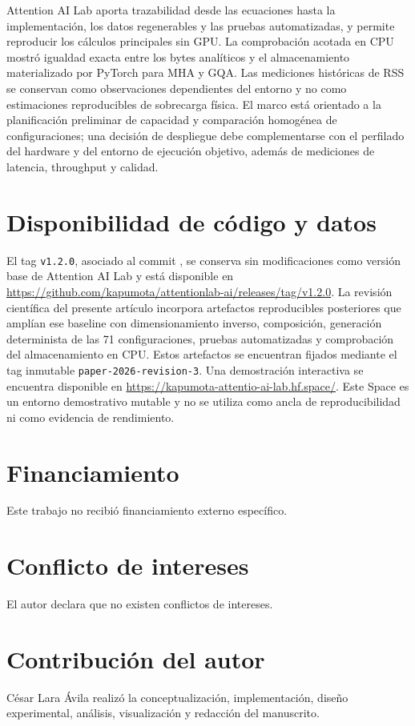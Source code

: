 \documentclass[a4paper,twocolumn]{article}
\begin{document}
Attention AI Lab aporta trazabilidad desde las ecuaciones hasta la implementación, los datos regenerables y las pruebas automatizadas, y permite reproducir los cálculos principales sin GPU. La comprobación acotada en CPU mostró igualdad exacta entre los bytes analíticos y el almacenamiento materializado por PyTorch para MHA y GQA. Las mediciones históricas de RSS se conservan como observaciones dependientes del entorno y no como estimaciones reproducibles de sobrecarga física. El marco está orientado a la planificación preliminar de capacidad y comparación homogénea de configuraciones; una decisión de despliegue debe complementarse con el perfilado del hardware y del entorno de ejecución objetivo, además de mediciones de latencia, throughput y calidad.

\section*{Disponibilidad de código y datos}
El tag \texttt{v1.2.0}, asociado al commit , se conserva sin modificaciones como versión base de Attention AI Lab y está disponible en \url{https://github.com/kapumota/attentionlab-ai/releases/tag/v1.2.0}. La revisión científica del presente artículo incorpora artefactos reproducibles posteriores que amplían ese baseline con dimensionamiento inverso, composición, generación determinista de las 71 configuraciones, pruebas automatizadas y comprobación del almacenamiento en CPU. Estos artefactos se encuentran fijados mediante el tag inmutable \texttt{paper-2026-revision-3}. Una demostración interactiva se encuentra disponible en \url{https://kapumota-attentio-ai-lab.hf.space/}. Este Space es un entorno demostrativo mutable y no se utiliza como ancla de reproducibilidad ni como evidencia de rendimiento.

\section*{Financiamiento}
Este trabajo no recibió financiamiento externo específico.

\section*{Conflicto de intereses}
El autor declara que no existen conflictos de intereses.

\section*{Contribución del autor}
César Lara Ávila realizó la conceptualización, implementación, diseño experimental, análisis, visualización y redacción del manuscrito.



\end{document}
